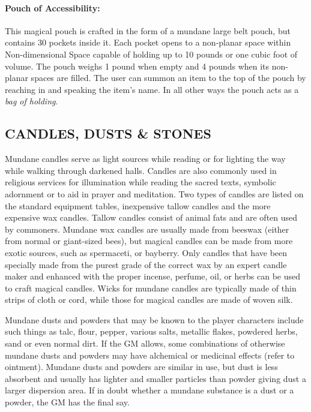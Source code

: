 \begin{multicols}{2}
\paragraph{Pouch of Accessibility:} This magical pouch is crafted in the form of a mundane large belt pouch, but contains 30 pockets inside it.  Each pocket opens to a non-planar space within Non-dimensional Space capable of holding up to 10 pounds or one cubic foot of volume.  The pouch weighs 1 pound when empty and 4 pounds when its non-planar spaces are filled.  The user can summon an item to the top of the pouch by reaching in and speaking the item's name.  In all other ways the pouch acts as a \textit{bag of holding}.

\subsection{CANDLES, DUSTS \& STONES}

Mundane candles serve as light sources while reading or for lighting the way while walking through darkened halls.  Candles are also commonly used in religious services for illumination while reading the sacred texts, symbolic adornment or to aid in prayer and meditation.  Two types of candles are listed on the standard equipment tables, inexpensive tallow candles and the more expensive wax candles.  Tallow candles consist of animal fats and are often used by commoners.  Mundane wax candles are usually made from beeswax (either from normal or giant-sized bees), but magical candles can be made from more exotic sources, such as spermaceti, or bayberry.  Only candles that have been specially made from the purest grade of the correct wax by an expert candle maker and enhanced with the proper incense, perfume, oil, or herbs can be used to craft magical candles.  Wicks for mundane candles are typically made of thin strips of cloth or cord, while those for magical candles are made of woven silk.

Mundane dusts and powders that may be known to the player characters include such things as talc, flour, pepper, various salts, metallic flakes, powdered herbs, sand or even normal dirt.  If the GM allows, some combinations of otherwise mundane dusts and powders may have alchemical or medicinal effects (refer to ointment).  Mundane dusts and powders are similar in use, but dust is less absorbent and usually has lighter and smaller particles than powder giving dust a larger dispersion area.  If in doubt whether a mundane substance is a dust or a powder, the GM has the final say.  


\end{multicols}
